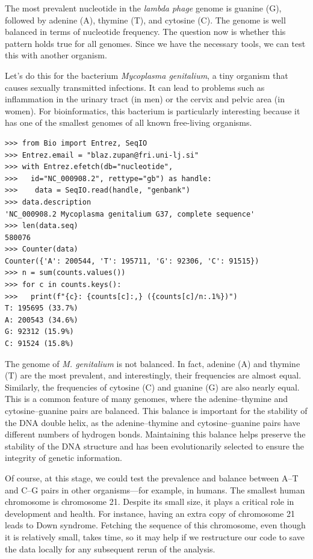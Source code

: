 The most prevalent nucleotide in the {\em lambda phage} genome is guanine (G), followed by adenine (A), thymine (T), and cytosine (C). The genome is well balanced in terms of nucleotide frequency. The question now is whether this pattern holds true for all genomes. Since we have the necessary tools, we can test this with another organism.

Let's do this for the bacterium {\em Mycoplasma genitalium}, a tiny organism that causes sexually transmitted infections. It can lead to problems such as inflammation in the urinary tract (in men) or the cervix and pelvic area (in women). For bioinformatics, this bacterium is particularly interesting because it has one of the smallest genomes of all known free-living organisms.

\vspace*{3mm}
\begin{lstlisting}
>>> from Bio import Entrez, SeqIO
>>> Entrez.email = "blaz.zupan@fri.uni-lj.si"
>>> with Entrez.efetch(db="nucleotide", 
>>>   id="NC_000908.2", rettype="gb") as handle:
>>>    data = SeqIO.read(handle, "genbank")
>>> data.description
'NC_000908.2 Mycoplasma genitalium G37, complete sequence'
>>> len(data.seq)
580076
>>> Counter(data)
Counter({'A': 200544, 'T': 195711, 'G': 92306, 'C': 91515})
>>> n = sum(counts.values())
>>> for c in counts.keys():
>>>   print(f"{c}: {counts[c]:,} ({counts[c]/n:.1%})")
T: 195695 (33.7%)
A: 200543 (34.6%)
G: 92312 (15.9%)
C: 91524 (15.8%)
\end{lstlisting}

The genome of {\em M. genitalium} is not balanced. In fact, adenine (A) and thymine (T) are the most prevalent, and interestingly, their frequencies are almost equal. Similarly, the frequencies of cytosine (C) and guanine (G) are also nearly equal. This is a common feature of many genomes, where the adenine–thymine and cytosine–guanine pairs are balanced. This balance is important for the stability of the DNA double helix, as the adenine–thymine and cytosine–guanine pairs have different numbers of hydrogen bonds. Maintaining this balance helps preserve the stability of the DNA structure and has been evolutionarily selected to ensure the integrity of genetic information.

Of course, at this stage, we could test the prevalence and balance between A–T and C–G pairs in other organisms—for example, in humans. The smallest human chromosome is chromosome 21. Despite its small size, it plays a critical role in development and health. For instance, having an extra copy of chromosome 21 leads to Down syndrome. Fetching the sequence of this chromosome, even though it is relatively small, takes time, so it may help if we restructure our code to save the data locally for any subsequent rerun of the analysis.

